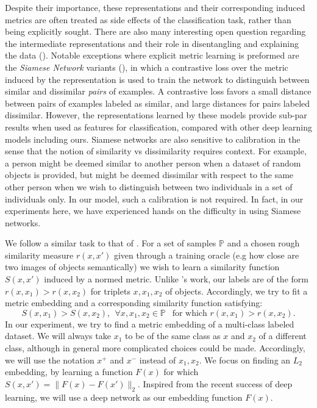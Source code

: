 \documentclass{article} %
\begin{document}
Despite their importance, these representations and their corresponding induced metrics are often  
treated as side effects of the  classification task, rather than being explicitly sought.
There are also many interesting open question regarding the intermediate representations and their role in disentangling and explaining the data (\citet{Bengio2013}).
Notable exceptions where explicit metric learning is preformed are the \emph{Siamese Network} variants (\citet{bromley1993signature,Chopra2005,hadsell2006dimensionality}), in which a contrastive loss over 
the metric induced by the representation  is used to train the network to distinguish between similar and dissimilar \emph{pairs} of examples.  A contrastive loss favors a small distance between pairs of examples
labeled as similar, and large distances for pairs labeled dissimilar.
However, the representations learned by these models provide sub-par results when used as features for classification, compared with other deep learning models including ours. Siamese networks are also sensitive to calibration in the sense that the notion of similarity vs dissimilarity requires context.  
For example, a person might be deemed similar to another person when a dataset of random objects is provided, but might be deemed dissimilar with respect to the same other person when we wish to distinguish between two individuals in a set of individuals only. %
In our model, such a calibration is not required.
In fact, in our experiments here, we have experienced hands on the difficulty in using Siamese networks.

We follow a similar task to that of \citet{chechik2010large}. For a set of samples $\mathbb{P}$ and a chosen rough similarity measure $r(x,x')$ given through a training oracle
(e.g how close are two images of objects semantically) we wish to learn a similarity function $S(x,x')$ induced by a normed metric.
Unlike  \citet{chechik2010large}'s work, our labels are of the form $r(x,x_1)>r(x,x_2)$ for triplets $x,x_1,x_2$ of objects.
Accordingly, we try to fit a metric embedding and a corresponding similarity function satisfying:
$$ S(x,x_1)>S(x,x_2), \ \ \forall x,x_1,x_2 \in \mathbb{P} \ \ \text{ for which } r(x,x_1)>r(x,x_2).$$
In our experiment, we try to find a metric embedding of a multi-class labeled dataset. We will always take $x_1$ to be of the same class as $x$ and $x_2$ of a different class, although in general more complicated choices could be made.
Accordingly, we will use the notation $x^{+}$ and $x^{-}$ instead of $x_1, x_2$.
We focus on finding an $L_2$ embedding, by learning a function $F(x)$ for which $S(x,x')=\|F(x)-F(x')\|_2$.
Inspired from the recent success of deep learning, we will use a deep network as our embedding function $F(x)$.
\end{document}
